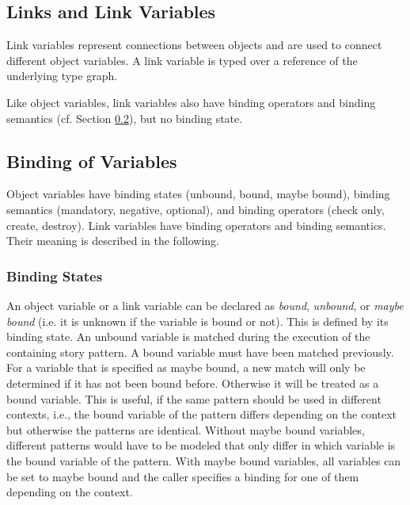 \subsection{Links and Link Variables}
\label{sec:StoryPatterns:links}

Link variables represent connections between objects and are used to connect
different object variables. A link variable is typed over a reference of the underlying
type graph.

Like object variables, link variables also have binding
operators and binding semantics (cf. Section \ref{sec:StoryPatterns:binding}), but no binding state.




\subsection{Binding of Variables}
\label{sec:StoryPatterns:binding}

Object variables have binding states (unbound, bound, maybe
bound), binding semantics (mandatory, negative, optional), and binding operators
(check only, create, destroy). Link variables have binding
operators and binding semantics.
Their meaning is described in the following. 


\subsubsection{Binding States}
\label{sec:StoryPatterns:binding:states}
An object variable or a link variable can be declared as \emph{bound}, \emph{unbound}, or
\emph{maybe bound} (i.e. it is unknown if the variable is bound or not). This is
defined by its binding state. An unbound variable is matched during the
execution of the containing story pattern. 
A bound variable must have been matched previously. 
For a variable that is specified as maybe bound, a new match will only be
determined if it has not been bound before. 
Otherwise it will be treated as a bound variable.
This is useful, if the same pattern should be used in different contexts, i.e., the bound variable of the pattern differs depending on the context but otherwise the patterns are identical.
Without maybe bound variables, different patterns would have to be modeled that only differ in which variable is the bound variable of the pattern.
With maybe bound variables, all variables can be set to maybe bound and the caller specifies a binding for one of them depending on the context.

